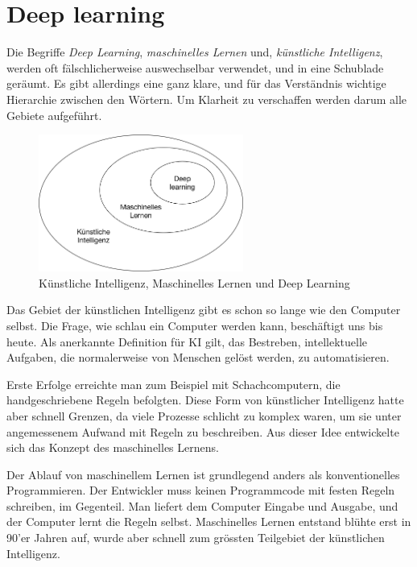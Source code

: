 \section{Deep learning}
Die Begriffe \textit{Deep Learning}, \textit{maschinelles Lernen} und, \textit{künstliche Intelligenz}, werden oft fälschlicherweise auswechselbar verwendet, und in eine Schublade geräumt. Es gibt allerdings eine ganz klare, und für das Verständnis wichtige Hierarchie zwischen den Wörtern. Um Klarheit zu verschaffen werden darum alle Gebiete aufgeführt.

\begin{figure}[hbt]
	\centering
		\includegraphics[width=0.6\textwidth]{assets/hierarchy.png}
	\caption{Künstliche Intelligenz, Maschinelles Lernen und Deep Learning}
	\label{img:hierachy}
\end{figure}

Das Gebiet der künstlichen Intelligenz gibt es schon so lange wie den Computer selbst. Die Frage, wie schlau ein Computer werden kann, beschäftigt uns bis heute. Als anerkannte Definition für KI gilt, das Bestreben, intellektuelle Aufgaben, die normalerweise von Menschen gelöst werden, zu automatisieren.

Erste Erfolge erreichte man zum Beispiel mit Schachcomputern, die handgeschriebene Regeln befolgten. Diese Form von künstlicher Intelligenz hatte aber schnell Grenzen, da viele Prozesse schlicht zu komplex waren, um sie unter angemessenem Aufwand mit Regeln zu beschreiben. Aus dieser Idee entwickelte sich das Konzept des maschinelles Lernens.

Der Ablauf von maschinellem Lernen ist grundlegend anders als konventionelles Programmieren. Der Entwickler muss  keinen Programmcode mit festen Regeln schreiben, im Gegenteil. Man liefert dem Computer Eingabe und Ausgabe, und der Computer lernt die Regeln selbst. Maschinelles Lernen entstand blühte erst in 90'er Jahren auf, wurde aber schnell zum grössten Teilgebiet der künstlichen Intelligenz.

